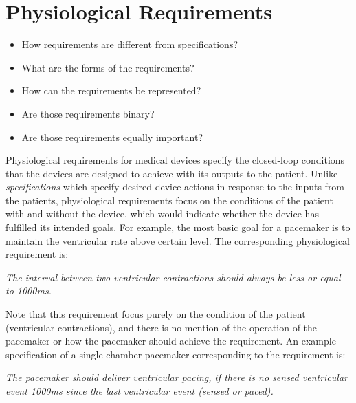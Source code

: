 \chapter{Physiological Requirements}
\begin{itemize}
	\item How requirements are different from specifications?
    \item What are the forms of the requirements?
    \item How can the requirements be represented?
    \item Are those requirements binary?
    \item Are those requirements equally important?
\end{itemize}

Physiological requirements for medical devices specify the closed-loop conditions that the devices are designed to achieve with its outputs to the patient. Unlike \emph{specifications} which specify desired device actions in response to the inputs from the patients, physiological requirements focus on the conditions of the patient with and without the device, which would indicate whether the device has fulfilled its intended goals. For example, the most basic goal for a pacemaker is to maintain the ventricular rate above certain level. The corresponding physiological requirement is:

 \emph{The interval between two ventricular contractions should always be less or equal to 1000ms.} 

Note that this requirement focus purely on the condition of the patient (ventricular contractions), and there is no mention of the operation of the pacemaker or how the pacemaker should achieve the requirement. An example specification of a single chamber pacemaker corresponding to the requirement is:  

\emph{The pacemaker should deliver ventricular pacing, if there is no sensed ventricular event 1000ms since the last ventricular event (sensed or paced).}
 
